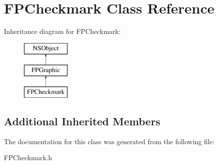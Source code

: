 \hypertarget{interface_f_p_checkmark}{}\section{F\+P\+Checkmark Class Reference}
\label{interface_f_p_checkmark}
Inheritance diagram for F\+P\+Checkmark\+:\begin{figure}[H]
\begin{center}
\leavevmode
\includegraphics[height=3.000000cm]{interface_f_p_checkmark}
\end{center}
\end{figure}
\subsection*{Additional Inherited Members}


The documentation for this class was generated from the following file\+:\begin{DoxyCompactItemize}
\item 
F\+P\+Checkmark.\+h\end{DoxyCompactItemize}
